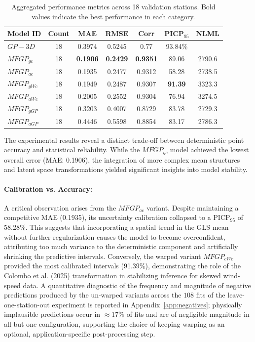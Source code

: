 \documentclass[12pt]{article}
\begin{document}
\begin{table}[h]
    \centering
    \scriptsize
    \renewcommand{\arraystretch}{1.2}
    \setlength{\tabcolsep}{5pt}
    \begin{tabular}{lcccccc}
        \toprule
        \textbf{Model ID} & \textbf{Count} & \textbf{MAE} & \textbf{RMSE} & \textbf{Corr} & \textbf{PICP$_{95}$} & \textbf{NLML} \\
        \midrule
        $GP-3D$   & 18 &0.3974 & 0.5245 &0.77 & 93.84\% \\
        $MFGP_{gc}$   & 18 & \textbf{0.1906} & \textbf{0.2429} & \textbf{0.9351} & 89.06 & 2790.6 \\
        $MFGP_{ac} $  & 18 & 0.1935 & 0.2477 & 0.9312 & 58.28 & 2738.5 \\
        $MFGP_{gWc}$ & 18 & 0.1949 & 0.2487 & 0.9307 & \textbf{91.39} & 3323.3 \\
        $MFGP_{aWc}$  & 18 & 0.2005 & 0.2552 & 0.9304 & 76.94 & 3274.5 \\
        $MFGP_{gGP}$    & 18 & 0.3203 & 0.4007 & 0.8729 & 83.78 & 2729.3 \\
        $MFGP_{aGP}$   & 18 & 0.4446 & 0.5598 & 0.8854 & 83.17 & 2786.3 \\
        \bottomrule
    \end{tabular}
    \caption{Aggregated performance metrics across 18 validation stations. Bold values indicate the best performance in each category.}
    \label{tab:summary_results}
\end{table}


The experimental results reveal a distinct trade-off between deterministic point accuracy and statistical reliability. While the $MFGP_{gc}$ model achieved the lowest overall error (MAE: 0.1906), the integration of more complex mean structures and latent space transformations yielded significant insights into model stability.

\paragraph{Calibration vs. Accuracy:} 
A critical observation arises from the $MFGP_{ac}$ variant. Despite maintaining a competitive MAE (0.1935), its uncertainty calibration collapsed to a PICP$_{95}$ of 58.28\%. This suggests that incorporating a spatial trend in the GLS mean without further regularization causes the model to become overconfident, attributing too much variance to the deterministic component and artificially shrinking the predictive intervals. Conversely, the warped variant $MFGP_{cWc}$ provided the most calibrated intervals (91.39\%), demonstrating the role of the Colombo et al. (2025) transformation in stabilizing inference for skewed wind-speed data. A quantitative diagnostic of the frequency and magnitude of negative predictions produced by the un-warped variants across the $108$ fits of the leave-one-station-out experiment is reported in Appendix~\ref{app:negatives}; physically implausible predictions occur in $\approx 17\%$ of fits and are of negligible magnitude in all but one configuration, supporting the choice of keeping warping as an optional, application-specific post-processing step.
\end{document}
